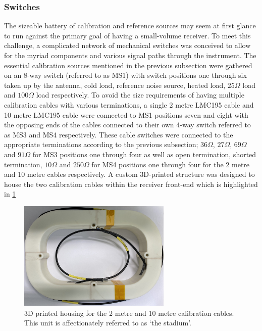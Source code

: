\subsubsection{Switches}
The sizeable battery of calibration and reference sources may seem at first glance to run against the primary goal of having a small-volume receiver. To meet this challenge, a complicated network of mechanical switches was conceived to allow for the myriad components and various signal paths through the instrument. The essential calibration sources mentioned in the previous subsection were gathered on an 8-way switch (referred to as MS1) with switch positions one through six taken up by the antenna, cold load, reference noise source, heated load, $25 \Omega$ load and $100 \Omega$ load respectively. To avoid the size requirements of having multiple calibration cables with various terminations, a single 2 metre LMC195 cable and 10 metre LMC195 cable were connected to MS1 positions seven and eight with the opposing ends of the cables connected to their own 4-way switch referred to as MS3 and MS4 respectively. These cable switches were connected to the appropriate terminations according to the previous subsection; $36 \Omega$, $27 \Omega$, $69 \Omega$ and $91 \Omega$ for MS3 positions one through four as well as open termination, shorted termination, $10 \Omega$ and $250 \Omega$ for MS4 positions one through four for the 2 metre and 10 metre cables respectively. A custom 3D-printed structure was designed to house the two calibration cables within the receiver front-end which is highlighted in \cref{fig:stadium}
\begin{figure}
    \centering
    \includegraphics[width=0.65\textwidth]{stadium}
    \caption{3D printed housing for the 2 metre and 10 metre calibration cables. This unit is affectionately referred to as ‘the stadium’.}
    \label{fig:stadium}
\end{figure}

